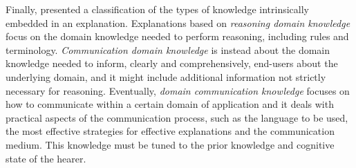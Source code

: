 \documentclass[final,1p,times]{elsarticle}
\begin{document}
Finally, \cite{barzilay1998new} presented a classification of the types of knowledge intrinsically embedded in an explanation. Explanations based on \textit{reasoning domain knowledge} focus on the domain knowledge needed to perform reasoning, including rules and terminology. \textit{Communication domain knowledge} is instead about the domain knowledge needed to inform, clearly and comprehensively, end-users about the underlying domain, and it might include additional information not strictly necessary for reasoning. Eventually, \textit{domain communication knowledge} focuses on how to communicate within a certain domain of application and it deals with practical aspects of the communication process, such as the language to be used, the most effective strategies for effective explanations and the communication medium. This knowledge must be tuned to the prior knowledge and cognitive state of the hearer. 
\end{document}
